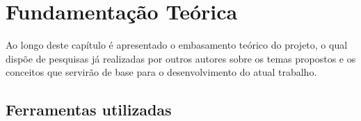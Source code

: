 
\chapter{Fundamentação Teórica}\label{chap:background}
Ao longo deste capítulo é apresentado o embasamento teórico do projeto,
o qual dispõe de pesquisas já realizadas por outros autores sobre os temas
propostos e os conceitos que servirão de base para o desenvolvimento do
atual trabalho.





\section{Ferramentas utilizadas}\label{sec:fundamental}
